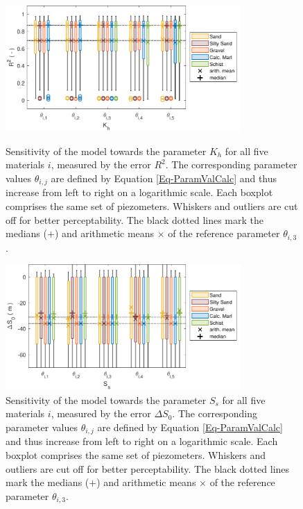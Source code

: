 \begin{figure}[p]
    \centering
    \includegraphics[width=0.8\textwidth]{./img/Fig-SensAna-K_h-R^2.pdf}
    \caption{Sensitivity of the model towards the parameter $K_h$ for all five materials $i$, measured by the error $R^2$. The corresponding parameter values $\theta_{i,j}$ are defined by Equation \eqref{Eq-ParamValCalc} and thus increase from left to right on a logarithmic scale. Each boxplot comprises the same set of piezometers. Whiskers and outliers are cut off for better perceptability. The black dotted lines mark the medians ($\bm{+}$) and arithmetic means $\bm{\times}$ of the reference parameter $\theta_{i,3}$.}
    \label{Fig-SAKhR2}
    
    \includegraphics[width=0.8\textwidth]{./img/Fig-SensAna-S_s-DeltaS_0.pdf}
    \caption{Sensitivity of the model towards the parameter $S_s$ for all five materials $i$, measured by the error $\Delta S_0$. The corresponding parameter values $\theta_{i,j}$ are defined by Equation \eqref{Eq-ParamValCalc} and thus increase from left to right on a logarithmic scale. Each boxplot comprises the same set of piezometers. Whiskers and outliers are cut off for better perceptability. The black dotted lines mark the medians ($\bm{+}$) and arithmetic means $\bm{\times}$ of the reference parameter $\theta_{i,3}$.}
    \label{Fig-SASsDeltaS0}
\end{figure}

